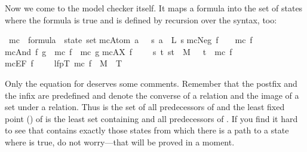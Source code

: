 \begin{isabellebody}
\begin{isamarkuptext}
Now we come to the model checker itself. It maps a formula into the set of
states where the formula is true and is defined by recursion over the syntax,
too:%
\end{isamarkuptext}%
\ mc\ {\isacharcolon}{\isacharcolon}\ {\isachardoublequote}formula\ {\isasymRightarrow}\ state\ set{\isachardoublequote}\isanewline
{}\isanewline
{\isachardoublequote}mc{\isacharparenleft}Atom\ a{\isacharparenright}\ \ {\isacharequal}\ {\isacharbraceleft}s{\isachardot}\ a\ {\isasymin}\ L\ s{\isacharbraceright}{\isachardoublequote}\isanewline
{\isachardoublequote}mc{\isacharparenleft}Neg\ f{\isacharparenright}\ \ \ {\isacharequal}\ {\isacharminus}mc\ f{\isachardoublequote}\isanewline
{\isachardoublequote}mc{\isacharparenleft}And\ f\ g{\isacharparenright}\ {\isacharequal}\ mc\ f\ {\isasyminter}\ mc\ g{\isachardoublequote}\isanewline
{\isachardoublequote}mc{\isacharparenleft}AX\ f{\isacharparenright}\ \ \ \ {\isacharequal}\ {\isacharbraceleft}s{\isachardot}\ {\isasymforall}t{\isachardot}\ {\isacharparenleft}s{\isacharcomma}t{\isacharparenright}\ {\isasymin}\ M\ \ {\isasymlongrightarrow}\ t\ {\isasymin}\ mc\ f{\isacharbraceright}{\isachardoublequote}\isanewline
{\isachardoublequote}mc{\isacharparenleft}EF\ f{\isacharparenright}\ \ \ \ {\isacharequal}\ lfp{\isacharparenleft}{\isasymlambda}T{\isachardot}\ mc\ f\ {\isasymunion}\ {\isacharparenleft}M{\isasyminverse}\ {\isacharbackquote}{\isacharbackquote}\ T{\isacharparenright}{\isacharparenright}{\isachardoublequote}%
\begin{isamarkuptext}%
\noindent
Only the equation for  deserves some comments. Remember that the
postfix \isa{{\isasyminverse}} and the infix \isa{{\isacharbackquote}{\isacharbackquote}} are predefined and denote the
converse of a relation and the image of a set under a relation.  Thus
 is the set of all predecessors of  and the least
fixed point () of  is the least set
 containing  and all predecessors of . If you
find it hard to see that  contains exactly those states from
which there is a path to a state where  is true, do not worry---that
will be proved in a moment.


\end{isamarkuptext}
\end{isabellebody}
